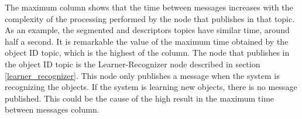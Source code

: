 			The maximum column shows that the time between messages increases with the complexity of the processing performed by the node that publishes in that topic. 
			As an example, the segmented and descriptors topics have similar time, around half a second. 
			It is remarkable the value of the maximum time obtained by the object ID topic, which is the highest of the column. 
			The node that publishes in the object ID topic is the Learner-Recognizer node described in section \ref{learner_recognizer}.
			This node only publishes a message when the system is recognizing the objects. 
			If the system is learning new objects, there is no message published. 
			This could be the cause of the high result in the maximum time between messages column. 
			


			\newpage

